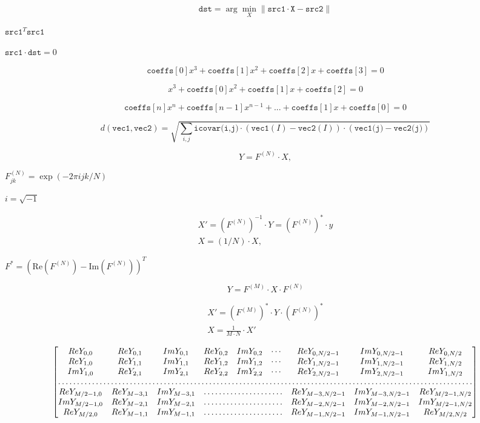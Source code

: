\documentclass{article}
\begin{document}
\[\texttt{dst} = \arg \min _X \| \texttt{src1} \cdot \texttt{X} - \texttt{src2} \|\]
\pagebreak

$\texttt{src1}^T\texttt{src1}$
\pagebreak

$\texttt{src1}\cdot\texttt{dst}=0$
\pagebreak

\[\texttt{coeffs} [0] x^3 + \texttt{coeffs} [1] x^2 + \texttt{coeffs} [2] x + \texttt{coeffs} [3] = 0\]
\pagebreak

\[x^3 + \texttt{coeffs} [0] x^2 + \texttt{coeffs} [1] x + \texttt{coeffs} [2] = 0\]
\pagebreak

\[\texttt{coeffs} [n] x^{n} + \texttt{coeffs} [n-1] x^{n-1} + ... + \texttt{coeffs} [1] x + \texttt{coeffs} [0] = 0\]
\pagebreak

\[d( \texttt{vec1} , \texttt{vec2} )= \sqrt{\sum_{i,j}{\texttt{icovar(i,j)}\cdot(\texttt{vec1}(I)-\texttt{vec2}(I))\cdot(\texttt{vec1(j)}-\texttt{vec2(j)})} }\]
\pagebreak

\[Y = F^{(N)} \cdot X,\]
\pagebreak

$F^{(N)}_{jk}=\exp(-2\pi i j k/N)$
\pagebreak

$i=\sqrt{-1}$
\pagebreak

\[\begin{array}{l} X'= \left (F^{(N)} \right )^{-1} \cdot Y = \left (F^{(N)} \right )^* \cdot y \\ X = (1/N) \cdot X, \end{array}\]
\pagebreak

$F^*=\left(\textrm{Re}(F^{(N)})-\textrm{Im}(F^{(N)})\right)^T$
\pagebreak

\[Y = F^{(M)} \cdot X \cdot F^{(N)}\]
\pagebreak

\[\begin{array}{l} X'= \left (F^{(M)} \right )^* \cdot Y \cdot \left (F^{(N)} \right )^* \\ X = \frac{1}{M \cdot N} \cdot X' \end{array}\]
\pagebreak

\[\begin{bmatrix} Re Y_{0,0} & Re Y_{0,1} & Im Y_{0,1} & Re Y_{0,2} & Im Y_{0,2} & \cdots & Re Y_{0,N/2-1} & Im Y_{0,N/2-1} & Re Y_{0,N/2} \\ Re Y_{1,0} & Re Y_{1,1} & Im Y_{1,1} & Re Y_{1,2} & Im Y_{1,2} & \cdots & Re Y_{1,N/2-1} & Im Y_{1,N/2-1} & Re Y_{1,N/2} \\ Im Y_{1,0} & Re Y_{2,1} & Im Y_{2,1} & Re Y_{2,2} & Im Y_{2,2} & \cdots & Re Y_{2,N/2-1} & Im Y_{2,N/2-1} & Im Y_{1,N/2} \\ \hdotsfor{9} \\ Re Y_{M/2-1,0} & Re Y_{M-3,1} & Im Y_{M-3,1} & \hdotsfor{3} & Re Y_{M-3,N/2-1} & Im Y_{M-3,N/2-1}& Re Y_{M/2-1,N/2} \\ Im Y_{M/2-1,0} & Re Y_{M-2,1} & Im Y_{M-2,1} & \hdotsfor{3} & Re Y_{M-2,N/2-1} & Im Y_{M-2,N/2-1}& Im Y_{M/2-1,N/2} \\ Re Y_{M/2,0} & Re Y_{M-1,1} & Im Y_{M-1,1} & \hdotsfor{3} & Re Y_{M-1,N/2-1} & Im Y_{M-1,N/2-1}& Re Y_{M/2,N/2} \end{bmatrix}\]
\pagebreak
\end{document}

